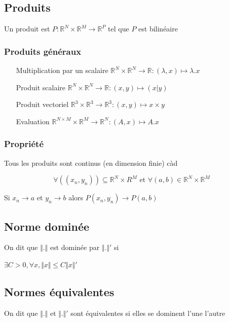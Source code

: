 \documentclass[a4paper,10pt]{article}
\newcommand{\ap}{\rightarrow}
\newcommand{\R}{\mathbb{R}}
\begin{document}
\subsection{Produits}

Un produit est $P : \R^N \times \R^M \ap \R^P$ tel que $P$ est bilinéaire

\subsubsection{Produits généraux}

\begin{itemize}
	\item[Multiplication par un scalaire]{$\R^N \times \R^N \ap \R : (\lambda, x) \mapsto \lambda.x$}
	\item[Produit scalaire]{$\R^N \times \R^N \ap \R : (x,y) \mapsto (x \vert y)$}
	\item[Produit vectoriel]{$\R^3 \times \R^3 \ap \R^3 : (x,y) \mapsto x \times y$}
	\item[Evaluation]{$\R^{N\times M} \times \R^M \ap \R^N : (A,x) \mapsto A.x$}
\end{itemize}

\subsubsection{Propriété}

Tous les produits sont continus (en dimension finie) càd 

$$\forall \left( \left( x_n,y_n \right) \right) \subseteq \R^N \times R^M \mbox{ et } \forall \left( a, b \right) \in \R^N \times \R^M$$

Si $x_n \ap a$ et $y_n \ap b$ alors $P(x_n,y_n) \ap P(a,b)$

\subsection{Norme dominée}

On dit que $\Vert. \Vert$ est dominée par $\Vert . \Vert'$ si

$\exists C > 0, \forall x, \Vert x \Vert \leq C \Vert x \Vert'$

\subsection{Normes équivalentes}

On dit que $\Vert . \Vert$ et $\Vert . \Vert'$ sont équivalentes si elles se dominent l'une l'autre
\end{document}
